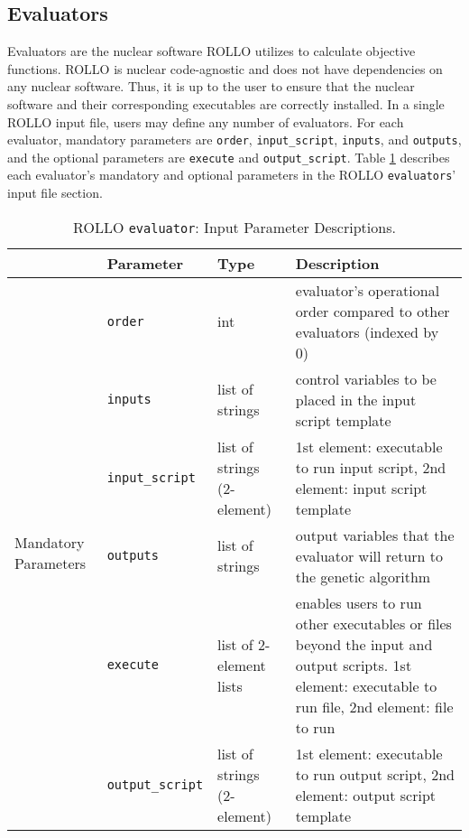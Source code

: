 \subsection{Evaluators}
Evaluators are the nuclear software \gls{ROLLO} utilizes to calculate objective functions. 
\gls{ROLLO} is nuclear code-agnostic and does not have dependencies on any 
nuclear software.
Thus, it is up to the user to ensure that the nuclear software and their corresponding 
executables are correctly installed. 
In a single \gls{ROLLO} input file, users may define any number of evaluators. 
For each evaluator, mandatory parameters are \texttt{order}, \texttt{input\_script}, 
\texttt{inputs}, and \texttt{outputs}, and the optional parameters are
\texttt{execute} and \texttt{output\_script}. 
Table \ref{tab:evaluator-inputs} describes each evaluator's mandatory and optional parameters 
in the \gls{ROLLO} \texttt{evaluators}' input file section.  
\begin{table}[htbp]
    \centering
    \onehalfspacing
    \caption{\acrfull{ROLLO} \texttt{evaluator}: Input Parameter Descriptions.}
	\label{tab:evaluator-inputs}
    \footnotesize
    \begin{tabular}{l|lp{2.5cm}p{7cm}}
    \hline
    & \textbf{Parameter} & \textbf{Type} & \textbf{Description} \\
    \hline
    \multirow{9}{2cm}{Mandatory Parameters} & \texttt{order} & int 
    & evaluator's operational order compared to other evaluators (indexed by 0) \\
    \cline{2-4}
    & \texttt{inputs} & list of strings & control variables to be placed in the input 
    script template \\
    \cline{2-4}
    & \texttt{input\_script} & list of strings (2-element) & 1st element: executable to 
    run input script, 2nd element: input script template \\
    \cline{2-4}
    & \texttt{outputs} & list of strings & output variables that the evaluator will return to the genetic algorithm \\
    \hline
    \multirow{4}{2cm}{Optional Parameters} & \texttt{execute} & list of 2-element lists &
    enables users to run other executables or files beyond the input and output scripts. 
    1st element: executable to run file, 2nd element: file to run \\
    \cline{2-4}
    & \texttt{output\_script} & list of strings (2-element) & 1st element: executable to 
    run output script, 2nd element: output script template \\
    \hline 
    \end{tabular}
    \end{table}

